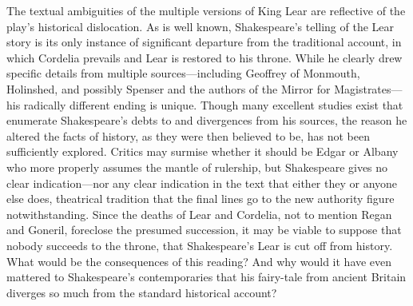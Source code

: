 	The textual ambiguities of the multiple versions of King Lear are reflective of the play's historical dislocation. As is well known, Shakespeare's telling of the Lear story is its only instance of significant departure from the traditional account, in which Cordelia prevails and Lear is restored to his throne. While he clearly drew specific details from multiple sources—including Geoffrey of Monmouth, Holinshed, and possibly Spenser and the authors of the Mirror for Magistrates—his radically different ending is unique. Though many excellent studies exist that enumerate Shakespeare's debts to and divergences from his sources, the reason he altered the facts of history, as they were then believed to be, has not been sufficiently explored. Critics may surmise whether it should be Edgar or Albany who more properly assumes the mantle of rulership, but Shakespeare gives no clear indication—nor any clear indication in the text that either they or anyone else does, theatrical tradition that the final lines go to the new authority figure notwithstanding. Since the deaths of Lear and Cordelia, not to mention Regan and Goneril, foreclose the presumed succession, it may be viable to suppose that nobody succeeds to the throne, that Shakespeare's Lear is cut off from history. What would be the consequences of this reading? And why would it have even mattered to Shakespeare's contemporaries that his fairy-tale from ancient Britain diverges so much from the standard historical account?
